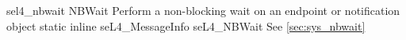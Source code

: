 %
%
%
%

\apidoc
{sel4_nbwait}
{NBWait}
{Perform a non-blocking wait on an endpoint or notification object}
{static inline seL4\_MessageInfo seL4\_NBWait}
{
}
{\messageinforetdesc}
{See \autoref{sec:sys_nbwait}}
